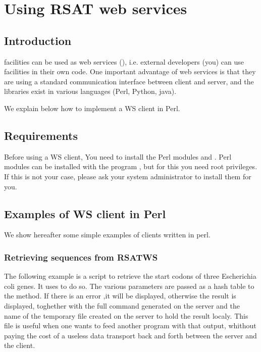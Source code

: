 
\chapter{Using RSAT web services}

\section{Introduction}

\RSAT facilities can be used as web services (), i.e. external developers
(you) can use \RSAT facilities in their own code. One important
advantage of web services is that they are using a standard
communication interface between client and server, and the libraries
exist in various languages (Perl, Python, java).

We explain below how to implement a WS client in Perl. 

\section{Requirements}

Before using a WS client, You need to install the Perl modules
 and . Perl modules can be installed with the program
, but for this you need root privileges. If this is not
your case, please ask your system administrator to install them for
you.

\section{Examples of WS client in Perl}

We show hereafter some simple examples of clients written in perl.

\subsection{Retrieving sequences from RSATWS}

The following example is a script to retrieve the start codons of three Escherichia coli genes. It uses  to do so. The various parameters are passed as a hash table to the method. If there is an error ,it will be displayed, otherwise the result is displayed, toghether with the full command generated on the server and the name of the temporary file created on the server to hold the result localy. This file is useful when one wants to feed another program with that output, whithout paying the cost of a useless data transport back and forth between the server and the client.

